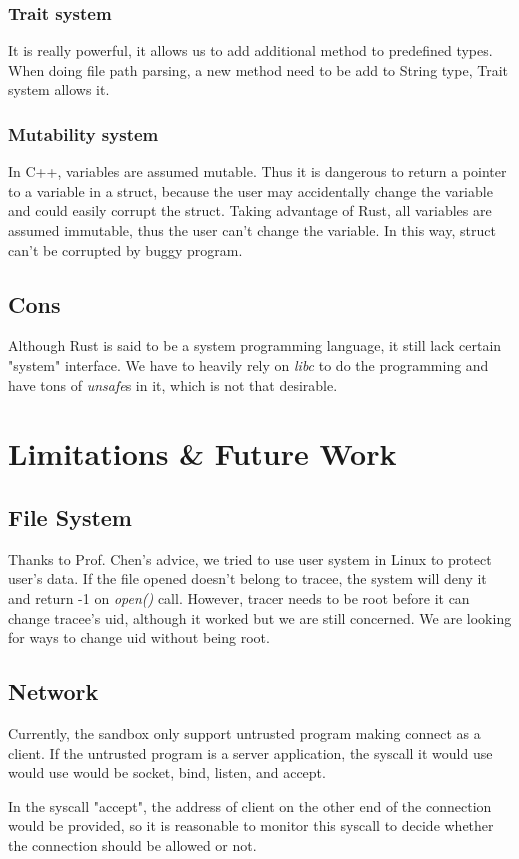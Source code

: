 \documentclass[conference,compsoc]{IEEEtran}
\begin{document}
			\subsubsection{Trait system} 
				It is really powerful, it allows us to add additional method to predefined types. 
				When doing file path parsing, a new method need to be add to String type, Trait system allows it.
			\subsubsection{Mutability system} 
				In C++, variables are assumed mutable. 
				Thus it is dangerous to return a pointer to a variable in a struct, because the user may accidentally change the variable and could easily corrupt the struct.
				Taking advantage of Rust, all variables are assumed immutable, thus the user can't change the variable. 
				In this way, struct can't be corrupted by buggy program.
	\subsection{Cons}
		\par %
			Although Rust is said to be a system programming language, it still lack certain "system" interface.
			We have to heavily rely on \emph{libc} to do the programming and have tons of \emph{unsafe}s in it, which is not that desirable. 				

\section{Limitations \& Future Work}
	\subsection{File System}
		\par
			Thanks to Prof. Chen's advice, we tried to use user system in Linux to protect user's data. 
			If the file opened doesn't belong to tracee, the system will deny it and return -1 on \emph{open()} call.
			However, tracer needs to be root before it can change tracee's uid, although it worked but we are still concerned. 
			We are looking for ways to change uid without being root.
	\subsection{Network}
		\par
			Currently, the sandbox only support untrusted program making connect as a client. 
			If the untrusted program is a server application, the syscall it would use would use would be socket, bind, listen, and accept. 
		\par
			In the syscall "accept", the address of client on the other end of the connection would be provided, so it is reasonable to monitor this syscall to decide whether the connection should be allowed or not.
\end{document}
